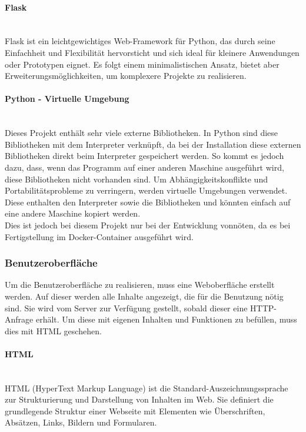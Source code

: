 \paragraph{Flask}\mbox{}\\
Flask ist ein leichtgewichtiges Web-Framework für Python, das durch seine Einfachheit und Flexibilität hervorsticht und sich ideal für kleinere Anwendungen oder Prototypen eignet. Es folgt einem minimalistischen Ansatz, bietet aber Erweiterungsmöglichkeiten, um komplexere Projekte zu realisieren. \cite{chatgpt}

\paragraph{Python - Virtuelle Umgebung}\mbox{}\\
Dieses Projekt enthält sehr viele externe Bibliotheken. In Python sind diese Bibliotheken mit dem Interpreter verknüpft, da bei der Installation diese externen Bibliotheken direkt beim Interpreter gespeichert werden. So kommt es jedoch dazu, dass, wenn das Programm auf einer anderen Maschine ausgeführt wird, diese Bibliotheken nicht vorhanden sind. Um Abhängigkeitskonflikte und Portabilitätsprobleme zu verringern, werden virtuelle Umgebungen verwendet. Diese enthalten den Interpreter sowie die Bibliotheken und könnten einfach auf eine andere Maschine kopiert werden.\\ Dies ist jedoch bei diesem Projekt nur bei der Entwicklung vonnöten, da es bei Fertigstellung im Docker-Container ausgeführt wird.

\subsubsection{Benutzeroberfläche}

Um die Benutzeroberfläche zu realisieren, muss eine Weboberfläche erstellt werden. Auf dieser werden alle Inhalte angezeigt, die für die Benutzung nötig sind. Sie wird vom Server zur Verfügung gestellt, sobald dieser eine HTTP-Anfrage erhält. Um diese mit eigenen Inhalten und Funktionen zu befüllen, muss dies mit HTML geschehen.

\paragraph{HTML}\mbox{}\\
HTML (HyperText Markup Language) ist die Standard-Auszeichnungssprache zur Strukturierung und Darstellung von Inhalten im Web. Sie definiert die grundlegende Struktur einer Webseite mit Elementen wie Überschriften, Absätzen, Links, Bildern und Formularen. \cite{chatgpt}\\

